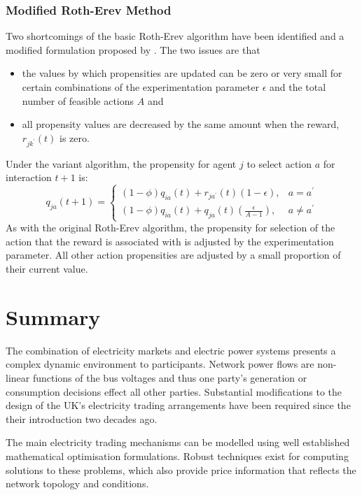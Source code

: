 \subsubsection{Modified Roth-Erev Method}
\label{sec:variant}
Two shortcomings of the basic Roth-Erev algorithm have been identified and a
modified formulation proposed by .  The two issues are
that
\begin{itemize}
  \item the values by which propensities are updated can be zero or very small
  for certain combinations of the experimentation parameter $\epsilon$ and
  the total number of feasible actions $A$ and
  \item all propensity values are decreased by the same amount when the reward,
  $r_{jk^\prime}(t)$ is zero.
\end{itemize}
Under the variant algorithm, the propensity for agent $j$ to select action $a$
for interaction $t+1$ is:
\begin{equation}
q_{ja}(t+1) =
\begin{cases}
(1-\phi)q_{ia}(t) + r_{ja^\prime}(t)(1-\epsilon), & \text{$a = a^\prime$} \\
(1-\phi)q_{ia}(t) + q_{ja}(t)(\frac{\epsilon}{A-1}), & \text{$a \ne
a^\prime$}
\end{cases}
\end{equation}
As with the original Roth-Erev algorithm, the propensity for selection of the
action that the reward is associated with is adjusted by the experimentation
parameter.  All other action propensities are adjusted by a small proportion of
their current value.

\section{Summary}
The combination of electricity markets and electric power systems presents a
complex dynamic environment to participants.  Network power flows are
non-linear functions of the bus voltages and thus one party's generation or
consumption decisions effect all other parties.  Substantial modifications to
the design of the UK's electricity trading arrangements have been required
since the their introduction two decades ago.

The main electricity trading mechanisms can be modelled using well established
mathematical optimisation formulations.  Robust techniques exist for computing
solutions to these problems, which also provide price information that reflects
the network topology and conditions.

